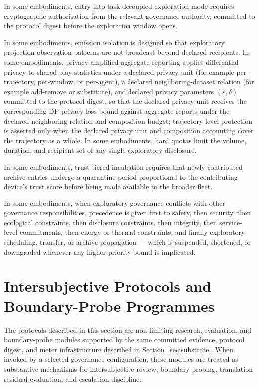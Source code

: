 \documentclass[a4paper,12pt]{article}
\begin{document}

In some embodiments, entry into task-decoupled exploration mode
requires cryptographic authorisation from the relevant governance
authority, committed to the protocol digest before the exploration
window opens.

In some embodiments, emission isolation is designed so that exploratory
projection-observation patterns are not broadcast beyond declared
recipients. In some embodiments, privacy-amplified aggregate reporting applies differential privacy to shared play statistics under a declared privacy unit (for example per-trajectory, per-window, or per-agent), a declared neighboring-dataset relation (for example add-remove or substitute), and declared privacy parameters $(\varepsilon, \delta)$ committed to the protocol digest, so that the declared privacy unit receives the corresponding DP privacy-loss bound against aggregate reports under the declared neighboring relation and composition budget; trajectory-level protection is asserted only when the declared privacy unit and composition accounting cover the trajectory as a whole. In some embodiments, hard quotas limit the volume,
duration, and recipient set of any single exploratory disclosure.

In some embodiments, trust-tiered incubation requires that newly
contributed archive entries undergo a quarantine period proportional
to the contributing device's trust score before being made available
to the broader fleet.

In some embodiments, when exploratory governance conflicts with other
governance responsibilities, precedence is given first to safety,
then security, then ecological constraints, then disclosure
constraints, then integrity, then service-level commitments, then
energy or thermal constraints, and finally exploratory scheduling,
transfer, or archive propagation --- which is suspended, shortened, or
downgraded whenever any higher-priority bound is implicated.

\section{Intersubjective Protocols and Boundary-Probe
  Programmes}


The protocols described in this section are non-limiting research,
evaluation, and boundary-probe modules supported by the same committed
evidence, protocol digest, and meter infrastructure described in
Section~\ref{sec:substrate}. When invoked by a selected governance
configuration, these modules are treated as substantive mechanisms
for intersubjective review, boundary probing, translation residual
evaluation, and escalation discipline.
\end{document}
